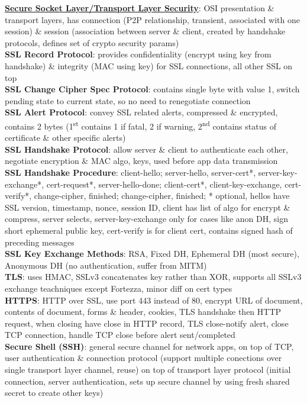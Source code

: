 \documentclass[a4paper]{article}
\begin{document}
\begin{multicols}{2}
        \underline{\textbf{Secure Socket Layer/Transport Layer Security}}: OSI presentation \& transport layers, has connection (P2P relationship, transient, associated with one session) \& session (association between server \& client, created by handshake protocols, defines set of crypto security params)\\
        \textbf{SSL Record Protocol}: provides confidentiality (encrypt using key from handshake) \& integrity (MAC using key) for SSL connections, all other SSL on top\\
        \textbf{SSL Change Cipher Spec Protocol}: contains single byte with value 1, switch pending state to current state, so no need to renegotiate connection\\
        \textbf{SSL Alert Protocol}: convey SSL related alerts, compressed \& encrypted, contains 2 bytes (1\textsuperscript{st} contains 1 if fatal, 2 if warning, 2\textsuperscript{nd} contains status of certificate \& other specific alerts)\\
        \textbf{SSL Handshake Protocol}: allow server \& client to authenticate each other, negotiate encryption \& MAC algo, keys, used before app data transmission\\
        \textbf{SSL Handshake Procedure}: client-hello; server-hello, server-cert*, server-key-exchange*, cert-request*, server-hello-done; client-cert*, client-key-exchange, cert-verify*, change-cipher, finished; change-cipher, finished; * optional, hellos have SSL version, timestamp, nonce, session ID, client has list of algo for encrypt \& compress, server selects, server-key-exchange only for cases like anon DH, sign short ephemeral public key, cert-verify is for client cert, contains signed hash of preceding messages\\
        \textbf{SSL Key Exchange Methods}: RSA, Fixed DH, Ephemeral DH (most secure), Anonymous DH (no authentication, suffer from MITM)\\
        \textbf{TLS}: uses HMAC, SSLv3 concatenates key rather than XOR, supports all SSLv3 exchange teachniques except Fortezza, minor diff on cert types\\
        \textbf{HTTPS}: HTTP over SSL, use port 443 instead of 80, encrypt URL of document, contents of document, forms \& header, cookies, TLS handshake then HTTP request, when closing have close in HTTP record, TLS close-notify alert, close TCP connection, handle TCP close before alert sent/completed\\
        \textbf{Secure Shell (SSH)}: general secure channel for network apps, on top of TCP, user authentication \& connection protocol (support multiple conections over single transport layer channel, reuse) on top of transport layer protocol (initial connection, server authentication, sets up secure channel by using fresh shared secret to create other keys)\\

\end{multicols}
\end{document}
